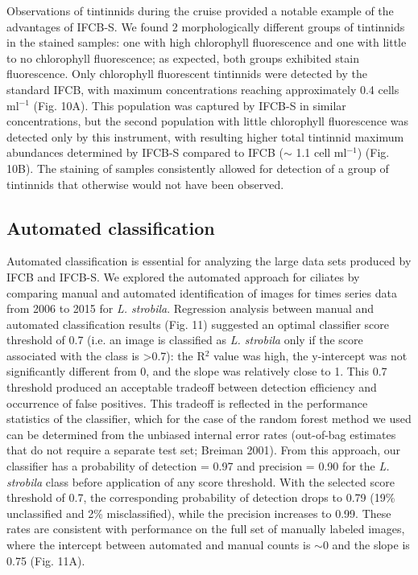 Observations of tintinnids during the cruise provided a notable example of the advantages of IFCB-S. We found 2 morphologically different groups of tintinnids in the stained samples: one with high
chlorophyll fluorescence and one with little to no chlorophyll fluorescence; as expected, both groups exhibited stain fluorescence. Only chlorophyll fluorescent tintinnids were detected by the standard IFCB, with maximum concentrations reaching approximately 0.4 cells ml$^{-1}$ (Fig. 10A). This population was captured by IFCB-S in similar concentrations, but the second population with little chlorophyll fluorescence was detected only by this instrument, with resulting higher total tintinnid maximum abundances determined by IFCB-S compared to IFCB ($\sim$ 1.1 cell ml$^{-1}$) (Fig. 10B). The staining of samples consistently allowed for detection of a group of tintinnids that otherwise would not have been observed.

\subsection {Automated classification}
Automated classification is essential for analyzing the large data sets produced by IFCB and IFCB-S. We explored the automated approach for ciliates by comparing manual and automated identification of images for times series data from 2006 to 2015 for \textit{L. strobila}. Regression analysis between manual and automated classification results (Fig. 11) suggested an optimal classifier score threshold of 0.7 (i.e. an image is classified as \textit{L. strobila} only if the score associated with the class is >0.7): the R$^{2}$ value was high, the y-intercept was not significantly different from 0, and the slope was relatively close to 1. This 0.7 threshold produced an acceptable tradeoff between detection efficiency and occurrence of false positives. This tradeoff is reflected in the performance statistics of the classifier, which for the case of the random forest method we used can be determined from the unbiased internal error rates (out-of-bag estimates that do not require a separate test set; Breiman 2001). From this approach, our classifier has a probability of detection = 0.97 and precision = 0.90 for the \textit{L. strobila} class before application of any score threshold. With the selected score threshold of 0.7, the corresponding probability of detection drops to 0.79 (19\% unclassified and 2\% misclassified), while the precision increases to 0.99. These rates are consistent with performance on the full set of manually labeled images, where the intercept
between automated and manual counts is $\sim$0 and the slope is 0.75 (Fig. 11A).

